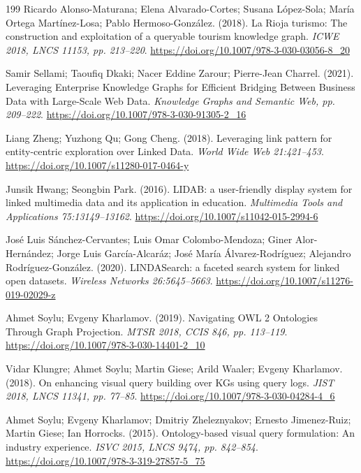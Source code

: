 \documentclass[manuscript,review,screen]{acmart}
\begin{document}
\begin{thebibliography}{199}
 Ricardo Alonso-Maturana; Elena Alvarado-Cortes; Susana L\'{o}pez-Sola; Mar\'{i}a Ortega Mart\'{i}nez-Losa; Pablo Hermoso-Gonz\'{a}lez. (2018). La Rioja turismo: The construction and exploitation of a queryable tourism knowledge graph. \textit{ICWE 2018, LNCS 11153, pp. 213--220}. \url{https://doi.org/10.1007/978-3-030-03056-8_20}

 Samir Sellami; Taoufiq Dkaki; Nacer Eddine Zarour; Pierre-Jean Charrel. (2021). Leveraging Enterprise Knowledge Graphs for Efficient Bridging Between Business Data with Large-Scale Web Data. \textit{Knowledge Graphs and Semantic Web, pp. 209--222}. \url{https://doi.org/10.1007/978-3-030-91305-2_16}

 Liang Zheng; Yuzhong Qu; Gong Cheng. (2018). Leveraging link pattern for entity-centric exploration over Linked Data. \textit{World Wide Web 21:421--453}. \url{https://doi.org/10.1007/s11280-017-0464-y}

 Junsik Hwang; Seongbin Park. (2016). LIDAB: a user-friendly display system for linked multimedia data and its application in education. \textit{Multimedia Tools and Applications 75:13149--13162}. \url{https://doi.org/10.1007/s11042-015-2994-6}

 Jos\'{e} Luis S\'{a}nchez-Cervantes; Luis Omar Colombo-Mendoza; Giner Alor-Hern\'{a}ndez; Jorge Luis Garc\'{i}a-Alcar\'{a}z; Jos\'{e} Mar\'{i}a \'{A}lvarez-Rodr\'{i}guez; Alejandro Rodr\'{i}guez-Gonz\'{a}lez. (2020). LINDASearch: a faceted search system for linked open datasets. \textit{Wireless Networks 26:5645--5663}. \url{https://doi.org/10.1007/s11276-019-02029-z}

 Ahmet Soylu; Evgeny Kharlamov. (2019). Navigating OWL 2 Ontologies Through Graph Projection. \textit{MTSR 2018, CCIS 846, pp. 113--119}. \url{https://doi.org/10.1007/978-3-030-14401-2_10}

 Vidar Klungre; Ahmet Soylu; Martin Giese; Arild Waaler; Evgeny Kharlamov. (2018). On enhancing visual query building over KGs using query logs. \textit{JIST 2018, LNCS 11341, pp. 77--85}. \url{https://doi.org/10.1007/978-3-030-04284-4_6}

 Ahmet Soylu; Evgeny Kharlamov; Dmitriy Zheleznyakov; Ernesto Jimenez-Ruiz; Martin Giese; Ian Horrocks. (2015). Ontology-based visual query formulation: An industry experience. \textit{ISVC 2015, LNCS 9474, pp. 842--854}. \url{https://doi.org/10.1007/978-3-319-27857-5_75}


\end{thebibliography}
\end{document}

